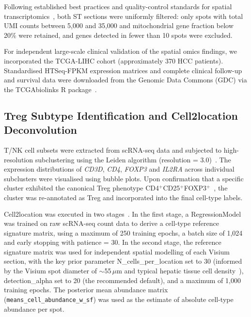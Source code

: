 \documentclass[12pt, a4paper]{article}
\begin{document}
Following established best practices and quality-control standards for spatial transcriptomics~\citep{williams2022introduction,palla2022squidpy}, both ST sections were uniformly filtered: only spots with total UMI counts between 5,000 and 35,000 and mitochondrial gene fraction below 20\% were retained, and genes detected in fewer than 10 spots were excluded.

For independent large-scale clinical validation of the spatial omics findings, we incorporated the TCGA-LIHC cohort (approximately 370 HCC patients). Standardised HTSeq-FPKM expression matrices and complete clinical follow-up and survival data were downloaded from the Genomic Data Commons (GDC) via the TCGAbiolinks R package~\citep{colaprico2016tcgabiolinks}.

\subsection{Treg Subtype Identification and Cell2location Deconvolution}

T/NK cell subsets were extracted from scRNA-seq data and subjected to high-resolution subclustering using the Leiden algorithm (resolution = 3.0)~\citep{traag2019leiden}. The expression distributions of \textit{CD3D}, \textit{CD4}, \textit{FOXP3} and \textit{IL2RA} across individual subclusters were visualised using bubble plots. Upon confirmation that a specific cluster exhibited the canonical Treg phenotype CD4$^+$CD25$^+$FOXP3$^+$~\citep{sakaguchi2020regulatory}, the cluster was re-annotated as Treg and incorporated into the final cell-type labels.

Cell2location was executed in two stages~\citep{kleshchevnikov2022cell2location}. In the first stage, a RegressionModel was trained on raw scRNA-seq count data to derive a cell-type reference signature matrix, using a maximum of 250 training epochs, a batch size of 1,024 and early stopping with patience = 30. In the second stage, the reference signature matrix was used for independent spatial modelling of each Visium section, with the key prior parameter N\_cells\_per\_location set to 30 (informed by the Visium spot diameter of $\sim$55\,$\mu$m and typical hepatic tissue cell density~\citep{kleshchevnikov2022cell2location}), detection\_alpha set to 20 (the recommended default), and a maximum of 1,000 training epochs. The posterior mean abundance matrix (\texttt{means\_cell\_abundance\_w\_sf}) was used as the estimate of absolute cell-type abundance per spot.
\end{document}
